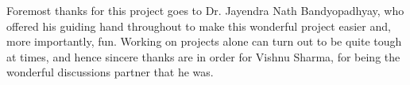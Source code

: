 \documentclass[11pt, a4paper, oneside]{Thesis} %
\title{\ttitle} %
\begin{document}
\frontmatter %


\fancyhead{} %
\rhead{\thepage} %
\lhead{} %

\pagestyle{fancy} %


\maketitle

\begin{acknowledgements}

Foremost thanks for this project goes to Dr. Jayendra Nath Bandyopadhyay, who offered his guiding hand throughout to make this wonderful project easier and, more importantly, fun. Working on projects alone can turn out to be quite tough at times, and hence sincere thanks are in order for Vishnu Sharma, for being the wonderful discussions partner that he was. 
\end{acknowledgements}


\pagestyle{fancy}

\tableofcontents %

\end{document}
